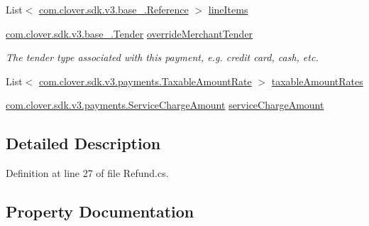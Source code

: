 \begin{DoxyCompactItemize}
\item 
List$<$ \hyperlink{classcom_1_1clover_1_1sdk_1_1v3_1_1base___1_1_reference}{com.\+clover.\+sdk.\+v3.\+base\+\_\+.\+Reference} $>$ \hyperlink{classcom_1_1clover_1_1sdk_1_1v3_1_1payments_1_1_refund_a034dd15da6df5f1aef65e9665f65a02c}{line\+Items}
\item 
\hyperlink{classcom_1_1clover_1_1sdk_1_1v3_1_1base___1_1_tender}{com.\+clover.\+sdk.\+v3.\+base\+\_\+.\+Tender} \hyperlink{classcom_1_1clover_1_1sdk_1_1v3_1_1payments_1_1_refund_a42fd1ab2cec842286b312eb5ebfc8dc0}{override\+Merchant\+Tender}
\begin{DoxyCompactList}\small\item\em The tender type associated with this payment, e.\+g. credit card, cash, etc. \end{DoxyCompactList}\item 
List$<$ \hyperlink{classcom_1_1clover_1_1sdk_1_1v3_1_1payments_1_1_taxable_amount_rate}{com.\+clover.\+sdk.\+v3.\+payments.\+Taxable\+Amount\+Rate} $>$ \hyperlink{classcom_1_1clover_1_1sdk_1_1v3_1_1payments_1_1_refund_a87c1d19cb80289ca323cf16eadb59865}{taxable\+Amount\+Rates}
\item 
\hyperlink{classcom_1_1clover_1_1sdk_1_1v3_1_1payments_1_1_service_charge_amount}{com.\+clover.\+sdk.\+v3.\+payments.\+Service\+Charge\+Amount} \hyperlink{classcom_1_1clover_1_1sdk_1_1v3_1_1payments_1_1_refund_a831aebe9b83f68263540f362f7bcda7e}{service\+Charge\+Amount}
\end{DoxyCompactItemize}


\subsection{Detailed Description}


Definition at line 27 of file Refund.\+cs.



\subsection{Property Documentation}
\mbox{\label{classcom_1_1clover_1_1sdk_1_1v3_1_1payments_1_1_refund_a34dd643d3722aee8578a5a85044bef18}} 
